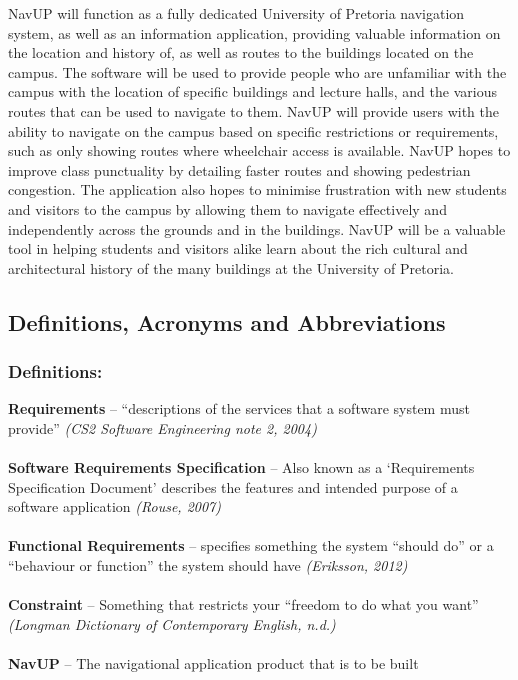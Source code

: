 \documentclass[11pt]{article}
\begin{document}
NavUP will function as a fully dedicated University of Pretoria navigation system, as well as an information application, providing valuable information on the location and history of, as well as routes to the buildings located on the campus. The software will be used to provide people who are unfamiliar with the campus with the location of specific buildings and lecture halls, and the various routes that can be used to navigate to them. NavUP will provide users with the ability to navigate on the campus based on specific restrictions or requirements, such as only showing routes where wheelchair access is available. NavUP hopes to improve class punctuality by detailing faster routes and showing pedestrian congestion. The application also hopes to minimise frustration with new students and visitors to the campus by allowing them to navigate effectively and independently across the grounds and in the buildings. NavUP will be a valuable tool in helping students and visitors alike learn about the rich cultural and architectural history of the many buildings at the University of Pretoria.

	\subsection{Definitions, Acronyms and Abbreviations}
		\subsubsection{Definitions:}
		\textbf{Requirements} – “descriptions of the services that a software system must provide” \textit{(CS2 Software Engineering note 2, 2004)} \\
		\\ \textbf{Software Requirements Specification} – Also known as a ‘Requirements Specification Document’ describes the features and intended purpose of a software application \textit{(Rouse, 2007)} \\
		\\ \textbf{Functional Requirements} – specifies something the system “should do” or a “behaviour or function” the system should have \textit{(Eriksson, 2012)} \\
		\\ \textbf{Constraint} – Something that restricts your “freedom to do what you want” \textit{(Longman Dictionary of Contemporary English, n.d.)} \\
		\\ \textbf{NavUP} – The navigational application product that is to be built
\end{document}
